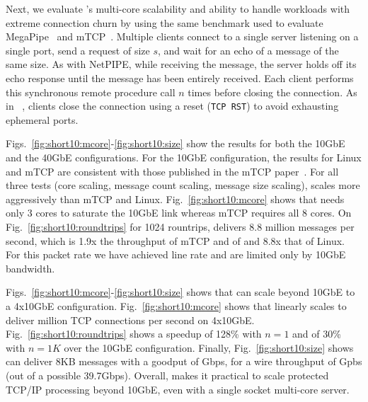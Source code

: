 Next, we evaluate \ix's multi-core scalability and ability to handle workloads
with extreme connection churn by using the same benchmark used to
evaluate MegaPipe~\cite{DBLP:conf/osdi/HanMCR12} and
mTCP~\cite{jeong2014mtcp}. Multiple clients connect to a single server
listening on a single port, send a request of size $s$, and wait for an
echo of a message of the same size.  As with NetPIPE, while receiving
the message, the server holds off its echo response until the message
has been entirely received.  Each client performs this synchronous
remote procedure call $n$ times before closing the connection.
As in ~\cite{jeong2014mtcp}, clients close the connection using a
reset (\texttt{TCP RST}) to avoid exhausting ephemeral ports.
 



Figs.~\ref{fig:short10:mcore}-\ref{fig:short10:size} show the results
for both the 10GbE and the 40GbE configurations.  For the 10GbE
configuration, the results for Linux and mTCP are consistent with those
published in the mTCP paper~\cite{jeong2014mtcp}.  For all three
tests (core scaling, message count scaling, message size scaling), \ix
scales more aggressively than mTCP and
Linux. Fig.~\ref{fig:short10:mcore} shows that \ix needs only 3 cores
to saturate the 10GbE link whereas mTCP requires all 8 cores. On
Fig.~\ref{fig:short10:roundtrips} for 1024 rountrips, \ix delivers 8.8
million messages per second, which is 1.9x the throughput of mTCP and
of and  8.8x that of Linux. For this packet rate we
have achieved line rate and are limited only by 10GbE bandwidth.


Figs.~\ref{fig:short10:mcore}-\ref{fig:short10:size} shows that
\ix can scale beyond 10GbE to a 4x10GbE configuration.
Fig.~\ref{fig:short10:mcore} shows that \ix linearly scales to deliver
million TCP connections per second on 4x10GbE.
Fig.~\ref{fig:short10:roundtrips} shows a speedup of 128\% with $n=1$
and of 30\% with $n=1K$ over the 10GbE configuration.  Finally,
Fig.~\ref{fig:short10:size} shows \ix can deliver 8KB messages with a
goodput of Gbps, for a wire throughput of Gpbs (out of
a possible 39.7Gbps).  Overall, \ix makes it practical to scale
protected TCP/IP processing beyond 10GbE, even with a single socket
multi-core server.

